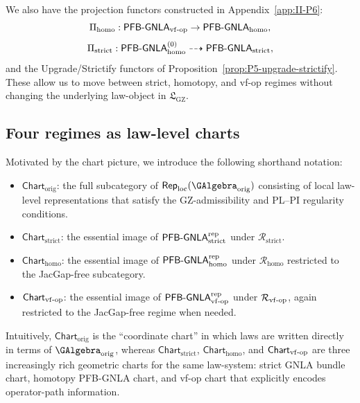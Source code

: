 \documentclass[11pt]{book}
\theoremstyle{plain}
\theoremstyle{definition}
\newcommand{\GZLS}{\ensuremath{\mathfrak{L}_{\mathrm{GZ}}}}       \newcommand{\GZLT}{\ensuremath{M_{!w}}}                           \newcommand{\GZLOC}{\ensuremath{A_M}}                             \newcommand{\GZLCurv}{\ensuremath{\mathcal{F}_{\mathrm{law}}}}
\begin{document}
We also have the projection functors constructed in
Appendix~\ref{app:II-P6}:
\[
  \Pi_{\mathrm{homo}} :
  \mathsf{PFB\text- GNLA}_{\mathrm{vf\text- op}}
  \to
  \mathsf{PFB\text- GNLA}_{\mathrm{homo}},
\]
\[
  \Pi_{\mathrm{strict}} :
  \mathsf{PFB\text- GNLA}_{\mathrm{homo}}^{(0)}
  \dashrightarrow
  \mathsf{PFB\text- GNLA}_{\mathrm{strict}},
\]
and the Upgrade/Strictify functors of
Proposition~\ref{prop:P5-upgrade-strictify}.  These allow us to move
between strict, homotopy, and vf-op regimes without changing the
underlying law-object in \(\GZLS\).



\subsection*{Four regimes as law-level charts}


Motivated by the chart picture, we introduce the following shorthand
notation:

\begin{itemize}
  \item \(\mathsf{Chart}_{\mathrm{orig}}\): the full subcategory of
        \(\mathsf{Rep}_{\mathrm{loc}}(\GAlgebra_{\mathrm{orig}})\)
        consisting of local law-level representations that satisfy the
        GZ-admissibility and PL--PI regularity conditions.
  \item \(\mathsf{Chart}_{\mathrm{strict}}\): the essential image of
        \(\mathsf{PFB\text- GNLA}^{\mathrm{rep}}_{\mathrm{strict}}\)
        under \(\mathcal{R}_{\mathrm{strict}}\).
  \item \(\mathsf{Chart}_{\mathrm{homo}}\): the essential image of
        \(\mathsf{PFB\text- GNLA}^{\mathrm{rep}}_{\mathrm{homo}}\) under
        \(\mathcal{R}_{\mathrm{homo}}\) restricted to the JacGap-free
        subcategory.
  \item \(\mathsf{Chart}_{\mathrm{vf\text- op}}\): the essential image
        of
        \(\mathsf{PFB\text- GNLA}^{\mathrm{rep}}_{\mathrm{vf\text- op}}\)
        under \(\mathcal{R}_{\mathrm{vf\text- op}}\), again restricted
        to the JacGap-free regime when needed.
\end{itemize}

Intuitively, \(\mathsf{Chart}_{\mathrm{orig}}\) is the ``coordinate
chart'' in which laws are written directly in terms of
\(\GAlgebra_{\mathrm{orig}}\), whereas
\(\mathsf{Chart}_{\mathrm{strict}}\),
\(\mathsf{Chart}_{\mathrm{homo}}\), and
\(\mathsf{Chart}_{\mathrm{vf\text- op}}\) are three increasingly rich
geometric charts for the same law-system: strict GNLA bundle chart,
homotopy PFB-GNLA chart, and vf-op chart that explicitly encodes
operator-path information.
\end{document}
